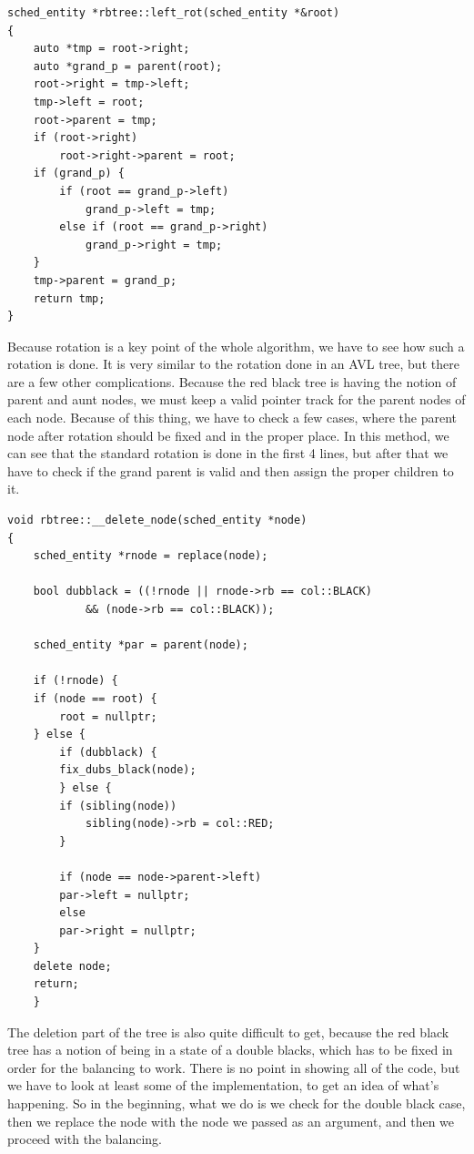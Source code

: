 \documentclass{article}
\begin{document}
\begin{lstlisting}
sched_entity *rbtree::left_rot(sched_entity *&root)
{
    auto *tmp = root->right;
    auto *grand_p = parent(root);
    root->right = tmp->left;
    tmp->left = root;
    root->parent = tmp;
    if (root->right)
        root->right->parent = root;
    if (grand_p) {
        if (root == grand_p->left)
            grand_p->left = tmp;
        else if (root == grand_p->right)
            grand_p->right = tmp;
    }
    tmp->parent = grand_p;
    return tmp;
}
\end{lstlisting}

Because rotation is a key point of the whole algorithm, we have to see how such a rotation is done. It is very similar to the rotation done in an AVL tree, but there are a few other complications. Because the red black tree is having the notion of parent and aunt nodes, we must keep a valid pointer track for the parent nodes of each node. Because of this thing, we have to check a few cases, where the parent node after rotation should be fixed and in the proper place. In this method, we can see that the standard rotation is done in the first 4 lines, but after that we have to check if the grand parent is valid and then assign the proper children to it.

\begin{lstlisting}
void rbtree::__delete_node(sched_entity *node)
{
    sched_entity *rnode = replace(node);

    bool dubblack = ((!rnode || rnode->rb == col::BLACK)
		    && (node->rb == col::BLACK));

    sched_entity *par = parent(node);

    if (!rnode) {
	if (node == root) {
	    root = nullptr;
	} else {
	    if (dubblack) {
		fix_dubs_black(node);
	    } else {
		if (sibling(node))
		    sibling(node)->rb = col::RED;
	    }

	    if (node == node->parent->left)
		par->left = nullptr;
	    else
		par->right = nullptr;
	}
	delete node;
	return;
    }
\end{lstlisting}

The deletion part of the tree is also quite difficult to get, because the red black tree has a notion of being in a state of a double blacks, which has to be fixed in order for the balancing to work. There is no point in showing all of the code, but we have to look at least some of the implementation, to get an idea of what's happening. So in the beginning, what we do is we check for the double black case, then we replace the node with the node we passed as an argument, and then we proceed with the balancing.
\end{document}

